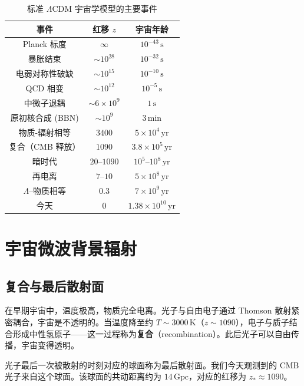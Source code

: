 \begin{table}[htbp]
\centering
\caption{标准 $\Lambda$CDM 宇宙学模型的主要事件}
\label{tab:cosmic_history}
\begin{tabular}{ccc}
\toprule
\textbf{事件} & \textbf{红移 $z$} & \textbf{宇宙年龄} \\
\midrule
Planck 标度 & $\infty$ & $10^{-43}\,\text{s}$ \\
暴胀结束 & $\sim 10^{28}$ & $10^{-32}\,\text{s}$ \\
电弱对称性破缺 & $\sim 10^{15}$ & $10^{-10}\,\text{s}$ \\
QCD 相变 & $\sim 10^{12}$ & $10^{-5}\,\text{s}$ \\
中微子退耦 & $\sim 6 \times 10^{9}$ & $1\,\text{s}$ \\
原初核合成 (BBN) & $\sim 10^{9}$ & $3\,\text{min}$ \\
物质-辐射相等 & $3400$ & $5 \times 10^{4}\,\text{yr}$ \\
复合（CMB 释放） & $1090$ & $3.8 \times 10^{5}\,\text{yr}$ \\
暗时代 & $20$--$1090$ & $10^{5}$--$10^{8}\,\text{yr}$ \\
再电离 & $7$--$10$ & $5 \times 10^{8}\,\text{yr}$ \\
$\Lambda$--物质相等 & $0.3$ & $7 \times 10^{9}\,\text{yr}$ \\
今天 & $0$ & $1.38 \times 10^{10}\,\text{yr}$ \\
\bottomrule
\end{tabular}
\end{table}

\section{宇宙微波背景辐射}
\label{sec:CMB}

\subsection{复合与最后散射面}

在早期宇宙中，温度极高，物质完全电离。光子与自由电子通过 Thomson 散射紧密耦合，宇宙是不透明的。当温度降至约 $T \sim 3000\,\text{K}$（$z \sim 1090$），电子与质子结合形成中性氢原子——这一过程称为\textbf{复合}（recombination）。此后光子可以自由传播，宇宙变得透明。

\begin{definition}
光子最后一次被散射的时刻对应的球面称为最后散射面。我们今天观测到的 CMB 光子来自这个球面。该球面的共动距离约为 $14\,\text{Gpc}$，对应的红移为 $z_* \approx 1090$。
\end{definition}

